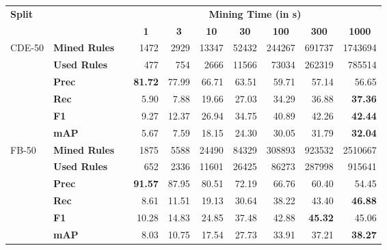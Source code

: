 \begin{tabular}{ l l c r r r r r r r }
    \toprule

    \multicolumn{1}{l}{\textbf{Split}} &
    & \phantom &
    \multicolumn{7}{c}{\textbf{Mining Time (in s)}} \\

    \cmidrule{4-10}

    &
    &&
    \multicolumn{1}{c}{\textbf{1}} &
    \multicolumn{1}{c}{\textbf{3}} &
    \multicolumn{1}{c}{\textbf{10}} &
    \multicolumn{1}{c}{\textbf{30}} &
    \multicolumn{1}{c}{\textbf{100}} &
    \multicolumn{1}{c}{\textbf{300}} &
    \multicolumn{1}{c}{\textbf{1000}} \\

    \midrule

    \multirow{6}{*}{CDE-50}
    & \textbf{Mined Rules} && \num{1472} & \num{2929} & \num{13347} & \num{52432} & \num{244267} & \num{691737} & \num{1743694} \\
    & \textbf{Used Rules}  && \num{477}  & \num{754}  & \num{2666}  & \num{11566} & \num{73034}  & \num{262319} & \num{785514}  \\

    \addlinespace

    & \textbf{Prec}        && \textbf{81.72}      & 77.99      & 66.71       & 63.51       & 59.71        & 57.14        & 56.65         \\
    & \textbf{Rec}         && 5.90       & 7.88       & 19.66       & 27.03       & 34.29        & 36.88        & \textbf{37.36}         \\
    & \textbf{F1}          && 9.27       & 12.37      & 26.94       & 34.75       & 40.89        & 42.26        & \textbf{42.44}         \\
    & \textbf{mAP}         && 5.67       & 7.59       & 18.15       & 24.30       & 30.05        & 31.79        & \textbf{32.04}         \\

    \midrule

    \multirow{6}{*}{FB-50}
    & \textbf{Mined Rules} && \num{1875} & \num{5588} & \num{24490} & \num{84329} & \num{308893} & \num{923532} & \num{2510667} \\
    & \textbf{Used Rules}  && \num{652}  & \num{2336} & \num{11601} & \num{26425} & \num{86273}  & \num{287998} & \num{915641}  \\

    \addlinespace

    & \textbf{Prec}        && \textbf{91.57}      & 87.95      & 80.51       & 72.19       & 66.76        & 60.40        & 54.45         \\
    & \textbf{Rec}         && 8.61       & 11.51      & 19.13       & 30.64       & 38.22        & 43.40        & \textbf{46.88}         \\
    & \textbf{F1}          && 10.28      & 14.83      & 24.85       & 37.48       & 42.88        & \textbf{45.32}        & 45.06         \\
    & \textbf{mAP}         && 8.03       & 10.75      & 17.54       & 27.73       & 33.91        & 37.21        & \textbf{38.27}         \\

    \bottomrule
\end{tabular}
